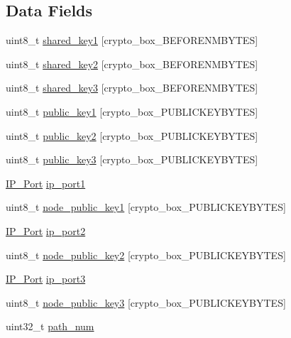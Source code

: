 \subsection*{Data Fields}
\begin{DoxyCompactItemize}
\item 
uint8\+\_\+t \hyperlink{struct_onion___path_ac38c2cdd308cce10c53e276cb664c644}{shared\+\_\+key1} \mbox{[}crypto\+\_\+box\+\_\+\+B\+E\+F\+O\+R\+E\+N\+M\+B\+Y\+T\+E\+S\mbox{]}
\item 
uint8\+\_\+t \hyperlink{struct_onion___path_a677ff69e40fecc070cfe5ebe1f4ecb71}{shared\+\_\+key2} \mbox{[}crypto\+\_\+box\+\_\+\+B\+E\+F\+O\+R\+E\+N\+M\+B\+Y\+T\+E\+S\mbox{]}
\item 
uint8\+\_\+t \hyperlink{struct_onion___path_ab9b6dd504522fbbb77500ab7e5d27121}{shared\+\_\+key3} \mbox{[}crypto\+\_\+box\+\_\+\+B\+E\+F\+O\+R\+E\+N\+M\+B\+Y\+T\+E\+S\mbox{]}
\item 
uint8\+\_\+t \hyperlink{struct_onion___path_a203561e286f807c2f057fc6bce17e2d8}{public\+\_\+key1} \mbox{[}crypto\+\_\+box\+\_\+\+P\+U\+B\+L\+I\+C\+K\+E\+Y\+B\+Y\+T\+E\+S\mbox{]}
\item 
uint8\+\_\+t \hyperlink{struct_onion___path_adb351a6df6a87dbb748077bd8081270d}{public\+\_\+key2} \mbox{[}crypto\+\_\+box\+\_\+\+P\+U\+B\+L\+I\+C\+K\+E\+Y\+B\+Y\+T\+E\+S\mbox{]}
\item 
uint8\+\_\+t \hyperlink{struct_onion___path_a0fa442ed05e4279ea8bcb1d039724f2b}{public\+\_\+key3} \mbox{[}crypto\+\_\+box\+\_\+\+P\+U\+B\+L\+I\+C\+K\+E\+Y\+B\+Y\+T\+E\+S\mbox{]}
\item 
\hyperlink{struct_i_p___port}{I\+P\+\_\+\+Port} \hyperlink{struct_onion___path_ad7670c0a1a9d05b2a807a9c1a7950b79}{ip\+\_\+port1}
\item 
uint8\+\_\+t \hyperlink{struct_onion___path_a38f4e3f7780648cf74f808d7942113d8}{node\+\_\+public\+\_\+key1} \mbox{[}crypto\+\_\+box\+\_\+\+P\+U\+B\+L\+I\+C\+K\+E\+Y\+B\+Y\+T\+E\+S\mbox{]}
\item 
\hyperlink{struct_i_p___port}{I\+P\+\_\+\+Port} \hyperlink{struct_onion___path_adcf789584e4efc296bc6f915d3e2e9f9}{ip\+\_\+port2}
\item 
uint8\+\_\+t \hyperlink{struct_onion___path_adc5a9730c2f43085e83ece3257af154a}{node\+\_\+public\+\_\+key2} \mbox{[}crypto\+\_\+box\+\_\+\+P\+U\+B\+L\+I\+C\+K\+E\+Y\+B\+Y\+T\+E\+S\mbox{]}
\item 
\hyperlink{struct_i_p___port}{I\+P\+\_\+\+Port} \hyperlink{struct_onion___path_aef20a4d17084ae724f2e496f8f7a106a}{ip\+\_\+port3}
\item 
uint8\+\_\+t \hyperlink{struct_onion___path_a4725b29fc0349714fa0ab0938844cf19}{node\+\_\+public\+\_\+key3} \mbox{[}crypto\+\_\+box\+\_\+\+P\+U\+B\+L\+I\+C\+K\+E\+Y\+B\+Y\+T\+E\+S\mbox{]}
\item 
uint32\+\_\+t \hyperlink{struct_onion___path_a6d69f3ea5100411c3599020055b8b78c}{path\+\_\+num}
\end{DoxyCompactItemize}


